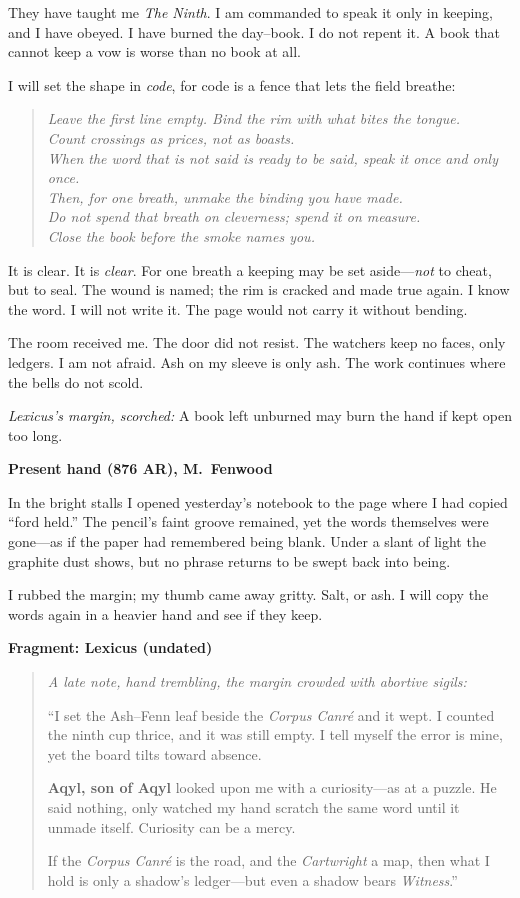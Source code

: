 \documentclass[11pt]{article}
\numberwithin{equation}{section} %
\theoremstyle{plain} %
\theoremstyle{definition} %
\theoremstyle{remark} %
\begin{document}
They have taught me \emph{The Ninth}. I am commanded to speak it only in keeping, and I have obeyed. I have burned the day--book. I do not repent it. A book that cannot keep a vow is worse than no book at all.

I will set the shape in \emph{code}, for code is a fence that lets the field breathe:

\begin{quote}\small
\textit{Leave the first line empty. Bind the rim with what bites the tongue.\\
Count crossings as prices, not as boasts.\\
When the word that is not said is ready to be said, speak it once and only once.\\
Then, for one breath, unmake the binding you have made.\\
Do not spend that breath on cleverness; spend it on measure.\\
Close the book before the smoke names you.}
\end{quote}

It is clear. It is \emph{clear}. For one breath a keeping may be set aside---\emph{not} to cheat, but to seal. The wound is named; the rim is cracked and made true again. I know the word. I will not write it. The page would not carry it without bending.

The room received me. The door did not resist. The watchers keep no faces, only ledgers. I am not afraid. Ash on my sleeve is only ash. The work continues where the bells do not scold.

\medskip
\noindent\textit{Lexicus's margin, scorched:} A book left unburned may burn the hand if kept open too long.

\medskip
\noindent\textbf{Present hand (876 AR), M.\ Fenwood}

\noindent In the bright stalls I opened yesterday's notebook to the page where I had copied ``ford held.'' The pencil's faint groove remained, yet the words themselves were gone---as if the paper had remembered being blank. Under a slant of light the graphite dust shows, but no phrase returns to be swept back into being.

\noindent I rubbed the margin; my thumb came away gritty. Salt, or ash. I will copy the words again in a heavier hand and see if they keep.

\noindent\textbf{Fragment: Lexicus (undated)}
\begin{quote}\itshape
A late note, hand trembling, the margin crowded with abortive sigils:

``I set the Ash--Fenn leaf beside the \emph{Corpus Canré} and it wept. I counted the ninth cup thrice, and it was still empty. I tell myself the error is mine, yet the board tilts toward absence.

\textbf{Aqyl, son of Aqyl} looked upon me with a curiosity---as at a puzzle. He said nothing, only watched my hand scratch the same word until it unmade itself. Curiosity can be a mercy.

If the \emph{Corpus Canré} is the road, and the \emph{Cartwright} a map, then what I hold is only a shadow's ledger---but even a shadow bears \emph{Witness}.''%
\end{quote}
\end{document}
